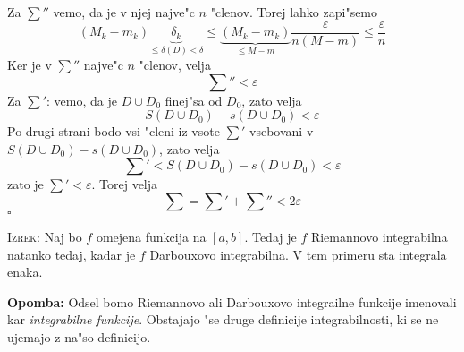 Za $\sum''$ vemo, da je v njej najve"c $n$ "clenov. Torej lahko zapi"semo
\begin{equation*}
(M_k - m_k) \underbrace{\delta_k}_{\leq \delta(D) < \delta} \leq \underbrace{(M_k - m_k)}_{\leq M - m} \dfrac{\varepsilon}{n (M - m)} \leq \dfrac{\varepsilon}{n}
\end{equation*}
Ker je v $\sum''$ najve"c $n$ "clenov, velja
\begin{equation*}
\sum'' < \varepsilon
\end{equation*}
Za $\sum'$: vemo, da je $D \cup D_0$ finej"sa od $D_0$, zato velja
\begin{equation*}
S(D \cup D_0) - s(D \cup D_0) < \varepsilon
\end{equation*}
Po drugi strani bodo vsi "cleni iz vsote $\sum'$ vsebovani v $S(D \cup D_0) - s(D \cup D_0)$, zato velja
\begin{equation*}
\sum' < S(D \cup D_0) - s(D \cup D_0) < \varepsilon
\end{equation*}
zato je $\sum' < \varepsilon$. Torej velja
\begin{equation*}
\sum = \sum' + \sum'' < 2\varepsilon
\end{equation*}
\hfill $\square$

\textsc{Izrek:} Naj bo $f$ omejena funkcija na $[a, b]$. Tedaj je $f$ Riemannovo integrabilna natanko tedaj, kadar je $f$ Darbouxovo integrabilna. V tem primeru sta integrala enaka.

\textbf{Opomba:} Odsel bomo Riemannovo ali Darbouxovo integrailne funkcije imenovali kar \emph{integrabilne funkcije}. Obstajajo "se druge definicije integrabilnosti, ki se ne ujemajo z na"so definicijo.

